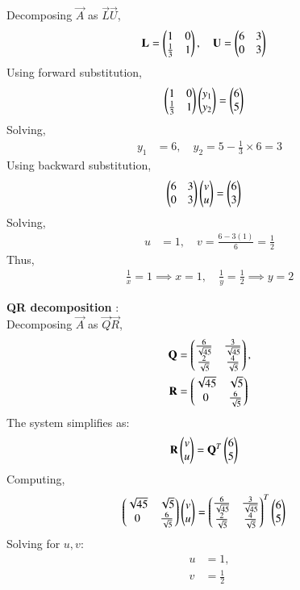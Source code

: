 \documentclass[journal]{IEEEtran}
\begin{document}
Decomposing $\vec{A}$ as $\vec{L}\vec{U}$,
\begin{align}
    \mathbf{L} &= \begin{pmatrix}1 & 0 \\ \frac{1}{3} & 1\end{pmatrix}, \quad \mathbf{U} = \begin{pmatrix}6 & 3 \\ 0 & 3\end{pmatrix}
\end{align}
Using forward substitution,
\begin{align}
    \begin{pmatrix}1 & 0 \\ \frac{1}{3} & 1\end{pmatrix} \begin{pmatrix}y_1 \\ y_2\end{pmatrix} &= \begin{pmatrix}6 \\ 5\end{pmatrix}
\end{align}
Solving,
\begin{align}
    y_1 &= 6, \quad y_2 = 5 - \frac{1}{3} \times 6 = 3
\end{align}
Using backward substitution,
\begin{align}
    \begin{pmatrix}6 & 3 \\ 0 & 3\end{pmatrix} \begin{pmatrix}v \\ u\end{pmatrix} &= \begin{pmatrix}6 \\ 3\end{pmatrix}
\end{align}
Solving,
\begin{align}
    u &= 1, \quad v = \frac{6 - 3(1)}{6} = \frac{1}{2}
\end{align}
Thus,
\begin{align}
    \frac{1}{x} = 1 \implies x = 1, \quad \frac{1}{y} = \frac{1}{2} \implies y = 2
\end{align}

\textbf{QR decomposition} : \\
Decomposing $\vec{A}$ as $\vec{Q}\vec{R}$,
\begin{align}
    \mathbf{Q} &= \begin{pmatrix}\frac{6}{\sqrt{45}} & \frac{3}{\sqrt{45}} \\ \frac{2}{\sqrt{5}} & \frac{4}{\sqrt{5}}\end{pmatrix}, \\
    \mathbf{R} &= \begin{pmatrix}\sqrt{45} & \sqrt{5} \\ 0 & \frac{6}{\sqrt{5}}\end{pmatrix}
\end{align}
The system simplifies as:
\begin{align}
    \mathbf{R} \begin{pmatrix}v \\ u\end{pmatrix} &= \mathbf{Q}^{T} \begin{pmatrix}6 \\ 5\end{pmatrix}
\end{align}
Computing,
\begin{align}
    \begin{pmatrix}\sqrt{45} & \sqrt{5} \\ 0 & \frac{6}{\sqrt{5}}\end{pmatrix} \begin{pmatrix}v \\ u\end{pmatrix} &= \begin{pmatrix}\frac{6}{\sqrt{45}} & \frac{3}{\sqrt{45}} \\ \frac{2}{\sqrt{5}} & \frac{4}{\sqrt{5}}\end{pmatrix}^{T} \begin{pmatrix}6 \\ 5\end{pmatrix}
\end{align}
Solving for $u, v$:
\begin{align}
    u &= 1, \\
    v &= \frac{1}{2}
\end{align}
\end{document}

